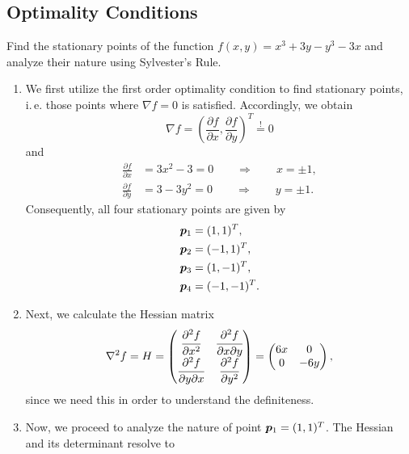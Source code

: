 \documentclass
[answers]
{exercise_sheet}
\begin{document}
\subsection*{Optimality Conditions}

\begin{Question}{9}
Find the stationary points of the function $f(x, y) = x^3 + 3y - y^3 - 3x$ and analyze their nature using Sylvester's Rule.
\end{Question}

\makeatletter\if@answers\begin{Answer}{35}
\begin{enumerate}
\item We first utilize the first order optimality condition to find stationary points, i.\,e. those points where $\nabla f = 0$ is satisfied. Accordingly, we obtain
\begin{equation*}
\nabla f = \left(\frac{\partial f}{\partial x}, \frac{\partial f}{\partial y}\right)^T \stackrel{!}{=} 0
\end{equation*}
and 
\begin{align*}
\frac{\partial f}{\partial x} &= 3x^2 - 3 = 0 \qquad\Rightarrow\qquad x = \pm 1 , \\
\frac{\partial f}{\partial y} &= 3 - 3y^2 = 0 \qquad\Rightarrow\qquad y = \pm 1 .
\end{align*}
Consequently, all four stationary points are given by
\begin{align*}
\bm{p}_1 &= (1, 1)^T , \\
\bm{p}_2 &= (-1, 1)^T , \\
\bm{p}_3 &= (1, -1)^T , \\
\bm{p}_4 &= (-1, -1)^T .
\end{align*}
\item Next, we calculate the Hessian matrix  
\begin{equation*}
\nabla^2 f = H = 
\begin{pmatrix}
\cfrac{\partial^2 f}{\partial x^2} & \cfrac{\partial^2 f}{\partial x \partial y} \\
\cfrac{\partial^2 f}{\partial y \partial x} & \cfrac{\partial^2 f}{\partial y^2}
\end{pmatrix}
= \begin{pmatrix}
	6x & 0 \\
	0 & -6y
\end{pmatrix}
,
\end{equation*}
since we need this in order to understand the definiteness.
\item Now, we proceed to analyze the nature of point $\bm{p}_1 = (1, 1)^T$. The Hessian and its determinant resolve to

\end{enumerate}
\end{Answer}
\end{document}
